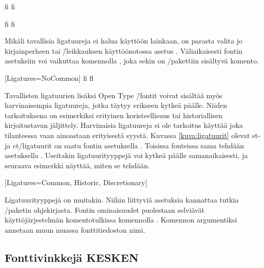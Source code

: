 \pagebreak[3]

\begin{koodilohkosis}
  \Large
  fi f\textcompwordmark i
\end{koodilohkosis}

\begin{tulossis}
  \Large
  fi f\textcompwordmark i
\end{tulossis}

Mikäli tavallisia ligatuureja ei halua käyttöön lainkaan, on parasta
valita jo kirjainperheen tai \=/leikkauksen käyttöönotossa asetus
. Väliaikaisesti fontin asetuksiin voi
vaikuttaa komennolla , joka sekin on
\-/pakettiin sisältyvä komento.

\begin{koodilohkosis}
  \setmainfont{…}[Ligatures=NoCommon] %
  { fi fl} %
\end{koodilohkosis}

Tavallisten ligatuurien lisäksi Open Type \=/fontit voivat sisältää myös
harvinaisempia ligatuureja, jotka täytyy erikseen kytkeä päälle. Niiden
tarkoituksena on esimerkiksi erityinen koristeellisuus tai
historiallisen kirjoitustavan jäljittely. Harvinaisia ligatuureja ei ole
tarkoitus käyttää joka tilanteessa vaan ainoastaan erityisestä syystä.
Kuvassa \ref{kuva:ligatuurit} olevat st- ja ct\-/ligatuurit on saatu
fontin asetuksella . Toisissa fonteissa
sama tehdään asetuksella .
Useitakin ligatuurityyppejä voi kytkeä päälle samanaikaisesti, ja
seuraava esimerkki näyttää, miten se tehdään.

\begin{koodilohkosis}
  \setmainfont{…}[Ligatures={Common, Historic, Discretionary}]
\end{koodilohkosis}

Ligatuurityyppejä on muitakin. Niihin liittyviä asetuksia kannattaa
tutkia \-/paketin ohjekirjasta.
Fontin ominaisuudet puolestaan selviävät käyttöjärjestelmän
komentotulkissa komennolla . Komennon argumentiksi
annetaan muun muassa fonttitiedoston nimi.

\subsection{Fonttivinkkejä KESKEN}


